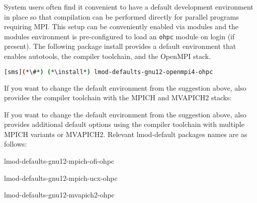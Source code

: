 System users often find it convenient to have a default development environment
in place so that compilation can be performed directly for parallel programs
requiring MPI. This setup can be conveniently enabled via modules and the \OHPC{}
modules environment is pre-configured to load an \texttt{ohpc} module on login
(if present). The following package install provides a default
environment that enables autotools, the \GNU{} compiler toolchain, and the
OpenMPI stack.

\begin{lstlisting}[language=bash]
[sms](*\#*) (*\install*) lmod-defaults-gnu12-openmpi4-ohpc
\end{lstlisting}

\begin{center}
\begin{tcolorbox}[]
\small
{}
If you want to change the default environment from the suggestion above, \OHPC{}
also provides the \GNU{} compiler toolchain with the MPICH and MVAPICH2 stacks:
\fi

If you want to change the default environment from the suggestion above, \OHPC{}
also provides additional default options using the \GNU{} compiler toolchain
with multiple MPICH variants or MVAPICH2. Relevant lmod-default packages names
are as follows:
\fi

\begin{itemize*}
\item lmod-defaults-gnu12-mpich-ofi-ohpc
\item lmod-defaults-gnu12-mpich-ucx-ohpc
\item lmod-defaults-gnu12-mvapich2-ohpc
\fi
\end{itemize*}
\end{tcolorbox}
\end{center}

